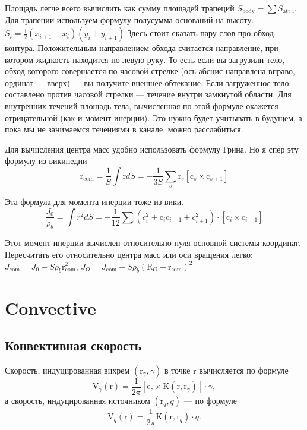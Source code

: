 \documentclass[a4paper,14pt]{extreport}
\newcommand{\br}[1]{\boldsymbol{\mathrm{#1}}}
\renewcommand{\vec}[1]{\br{#1}}
\newcommand{\com}{\text{com}}
\begin{document}
Площадь легче всего вычислить как сумму площадей трапеций $S_\text{body} = \sum S_\text{att~i}$. Для трапеции используем формулу полусумма оснований на высоту. $S_i = \frac{1}{2}(x_{i+1}-x_i)(y_i+y_{i+1})$
Здесь стоит сказать пару слов про обход контура. Положительным направлением обхода считается направление, при котором жидкость находится по левую руку. То есть если вы загрузили тело, обход которого совершается по часовой стрелке (ось абсцис направлена вправо, ординат --- вверх) --- вы получите внешнее обтекание. Если загруженное тело составлено против часовой стрелки --- течение внутри замкнутой области. Для внутренних течений площадь тела, вычисленная по этой формуле окажется отрицательной (как и момент инерции). Это нужно будет учитывать в будущем, а пока мы не занимаемся течениями в канале, можно расслабиться.

Для вычисления центра масс удобно использовать формулу Грина. Но я спер эту формулу из википедии
\begin{equation*}
\vec r_\com
= \dfrac{1}{S}\int \vec r dS
= -\dfrac{1}{3S}\sum_s \vec r_s [\vec c_{s} \times \vec c_{s+1}]
\end{equation*}

Эта формула для момента инерции тоже из вики.
\begin{equation*}
\dfrac{J_0}{\rho_b} = \int r^2 dS =
-\dfrac{1}{12} \sum
\left(
	c_i^2 + \vec c_i \vec c_{i+1} + c_{i+1}^2
\right) \cdot [\vec c_i \times \vec c_{i+1}]
\end{equation*}

Этот момент инерции вычислен относительно нуля основной системы координат. Пересчитать его относительно центра масс или оси вращения легко: $J_\com = J_0 - S \rho_b \vec r_\com^2$, $J_O = J_\com + S \rho_b (\vec R_O - \vec r_\com)^2$

\section{Convective}
\subsection{Конвективная скорость}
Скорость, индуцированная вихрем $(\vec r_\gamma, \gamma)$ в точке $\vec r$
вычисляется по формуле
\begin{equation}
\label{eq_VortexConvective}
\vec V_\gamma(\vec r) = \frac{1}{2\pi} [\vec e_z \times \vec K(\vec r, \vec r_\gamma)] \cdot \gamma,
\end{equation}
а скорость, индуцированная источником $(\vec r_q, q)$ --- по формуле
\begin{equation}
\label{eq_SourceConvective}
\vec V_q(\vec r) = \frac{1}{2\pi} \vec K(\vec r, \vec r_q) \cdot q.
\end{equation}
\end{document}
